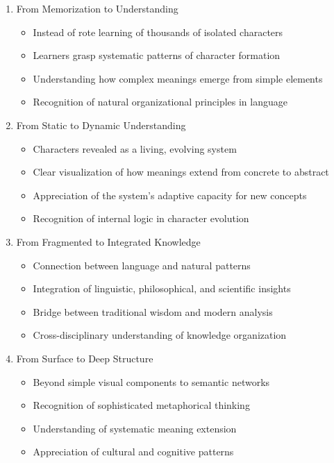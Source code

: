 \documentclass[11pt,letterpaper]{article}
\begin{document}
\begin{enumerate}[label=(\arabic{enumi})]
\item
  From Memorization to Understanding

\begin{itemize}
\tightlist
\item
  Instead of rote learning of thousands of isolated characters
\item
  Learners grasp systematic patterns of character formation
\item
  Understanding how complex meanings emerge from simple elements
\item
  Recognition of natural organizational principles in language
\end{itemize}

\item
  From Static to Dynamic Understanding

\begin{itemize}
\tightlist
\item
  Characters revealed as a living, evolving system
\item
  Clear visualization of how meanings extend from concrete to abstract
\item
  Appreciation of the system's adaptive capacity for new concepts
\item
  Recognition of internal logic in character evolution
\end{itemize}

\item
  From Fragmented to Integrated Knowledge

\begin{itemize}
\tightlist
\item
  Connection between language and natural patterns
\item
  Integration of linguistic, philosophical, and scientific insights
\item
  Bridge between traditional wisdom and modern analysis
\item
  Cross-disciplinary understanding of knowledge organization
\end{itemize}

\item
  From Surface to Deep Structure

\begin{itemize}
\tightlist
\item
  Beyond simple visual components to semantic networks
\item
  Recognition of sophisticated metaphorical thinking
\item
  Understanding of systematic meaning extension
\item
  Appreciation of cultural and cognitive patterns
\end{itemize}

\end{enumerate}
\end{document}
